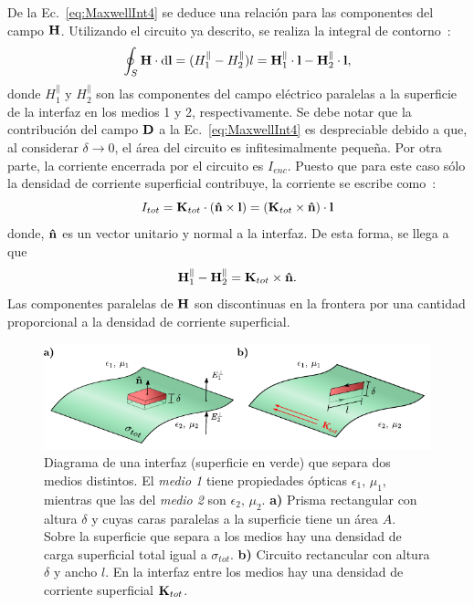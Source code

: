 De la Ec.~\eqref{eq:MaxwellInt4} se deduce una relación para las componentes del campo $\vb{H}$. Utilizando el circuito ya descrito, se realiza la integral de contorno~\cite{Griffiths}:
\begin{equation}
\oint_{S}\vb{H}\cdot\dd{\vb{l}}=(H^{\parallel}_{1}-H^{\parallel}_{2})l=\vb{H}^{\parallel}_{1}\cdot\vb{l}-\vb{H}^{\parallel}_{2}\cdot\vb{l},
\end{equation}
donde $H_{1}^{\parallel}$ y $H_{2}^{\parallel}$ son las componentes del campo eléctrico paralelas a la superficie de la interfaz en los medios 1 y 2, respectivamente. Se debe notar que la contribución del campo $\vb{D}$ a la Ec.~\eqref{eq:MaxwellInt4} es despreciable debido a que, al considerar $\delta\to0$, el área del circuito es infitesimalmente pequeña. Por otra parte, la corriente encerrada por el circuito es
$I_{enc}$. Puesto que para este caso sólo la densidad de corriente superficial contribuye, la corriente se escribe como~\cite{Griffiths}: 
\begin{equation}
I_{tot}=\vb{K}_{tot}\cdot\left(\vu{n}\times\vb{l}\right)=\left(\vb{K}_{tot}\times\vu{n}\right)\cdot \vb{l} 
\end{equation}
donde, $\vu{n}$ es un vector unitario y normal a la interfaz. De esta forma, se llega a que~\cite{Griffiths}
\begin{equation}
\vb{H}_{1}^{\parallel}-\vb{H}^{\parallel}_{2}=\vb{K}_{tot}\times\vu{n}.
\end{equation}
Las componentes paralelas de $\vb{H}$ son discontinuas en la frontera por una cantidad proporcional a la densidad de corriente superficial.
\begin{figure}[ht!]
	\centering
	\includegraphics[width=12.5cm]{1-Capitulo-Repaso/0-Diagramas/dibujo.pdf}
	\caption[Condiciones de frontera]{Diagrama de una interfaz (superficie en verde) que separa dos medios distintos. El \textit{medio 1} tiene propiedades ópticas $\epsilon_{1},\,\mu_{1}$, mientras que las del \textit{medio 2} son $\epsilon_{2},\,\mu_{2}$. \textbf{a)} Prisma rectangular con altura $\delta$ y cuyas caras paralelas a la superficie tiene un área $A$. Sobre la superficie que separa a los medios hay una densidad de carga superficial total igual a $\sigma_{tot}$. \textbf{b)} Circuito rectancular con altura $\delta$ y ancho $l$. En la interfaz entre los medios hay una densidad de corriente superficial $\vb{K}_{tot}$.}
	\label{fig:BoundaryConditions} 
\end{figure}
